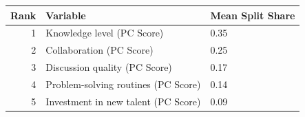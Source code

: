 
\begin{tabular}{rll}
\toprule
Rank & Variable & Mean Split Share\\
\midrule
1 & Knowledge level (PC Score) & 0.35\\
2 & Collaboration (PC Score) & 0.25\\
3 & Discussion quality (PC Score) & 0.17\\
4 & Problem-solving routines (PC Score) & 0.14\\
5 & Investment in new talent (PC Score) & 0.09\\
\bottomrule
\end{tabular}
